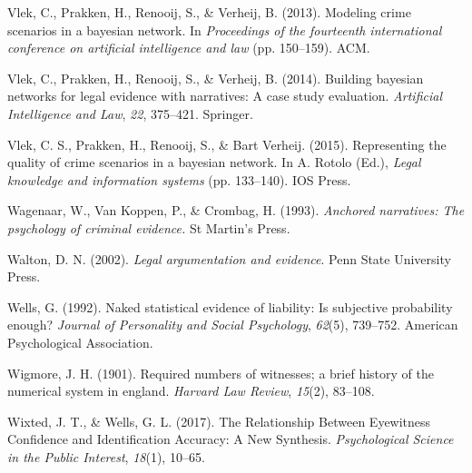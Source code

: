 \documentclass[11pt,dvipsnames,enabledeprecatedfontcommands]{scrartcl}
\begin{document}
\leavevmode\hypertarget{ref-vlek2013modeling}{}%
Vlek, C., Prakken, H., Renooij, S., \& Verheij, B. (2013). Modeling
crime scenarios in a bayesian network. In \emph{Proceedings of the
fourteenth international conference on artificial intelligence and law}
(pp. 150--159). ACM.

\leavevmode\hypertarget{ref-vlek2014building}{}%
Vlek, C., Prakken, H., Renooij, S., \& Verheij, B. (2014). Building
bayesian networks for legal evidence with narratives: A case study
evaluation. \emph{Artificial Intelligence and Law}, \emph{22}, 375--421.
Springer.

\leavevmode\hypertarget{ref-vlek2015}{}%
Vlek, C. S., Prakken, H., Renooij, S., \& Bart Verheij. (2015).
Representing the quality of crime scenarios in a bayesian network. In A.
Rotolo (Ed.), \emph{Legal knowledge and information systems} (pp.
133--140). IOS Press.

\leavevmode\hypertarget{ref-wagenaar1993anchored}{}%
Wagenaar, W., Van Koppen, P., \& Crombag, H. (1993). \emph{Anchored
narratives: The psychology of criminal evidence.} St Martin's Press.

\leavevmode\hypertarget{ref-Walton2002}{}%
Walton, D. N. (2002). \emph{Legal argumentation and evidence}. Penn
State University Press.

\leavevmode\hypertarget{ref-wells1992naked}{}%
Wells, G. (1992). Naked statistical evidence of liability: Is subjective
probability enough? \emph{Journal of Personality and Social Psychology},
\emph{62}(5), 739--752. American Psychological Association.

\leavevmode\hypertarget{ref-wigmore1901number}{}%
Wigmore, J. H. (1901). Required numbers of witnesses; a brief history of
the numerical system in england. \emph{Harvard Law Review},
\emph{15}(2), 83--108.

\leavevmode\hypertarget{ref-wixted2017RelationshipEyewitnessConfidence}{}%
Wixted, J. T., \& Wells, G. L. (2017). The Relationship Between
Eyewitness Confidence and Identification Accuracy: A New Synthesis.
\emph{Psychological Science in the Public Interest}, \emph{18}(1),
10--65.
\end{document}
